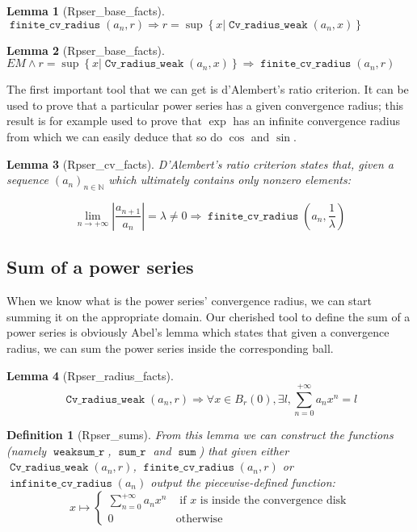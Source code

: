 \documentclass[submission,copyright]{eptcs}
\newcommand{\N}{\mathbb{N}}
\DeclareMathOperator{\cvrw}{\mathtt{Cv\_radius\_weak}}
\DeclareMathOperator{\fcvr}{\mathtt{finite\_cv\_radius}}
\DeclareMathOperator{\icvr}{\mathtt{infinite\_cv\_radius}}
\DeclareMathOperator{\Pwsr}{\mathtt{weaksum\_r}}
\DeclareMathOperator{\Psumr}{\mathtt{sum\_r}}
\DeclareMathOperator{\Psum}{\mathtt{sum}}
\newtheorem{definition}{Definition}
\newtheorem{lemma}{Lemma}
\begin{document}
\begin{lemma}[Rpser\_base\_facts] $\fcvr{}(a_n,r) \Rightarrow r = \sup
\left\lbrace x | \cvrw{}(a_n, x) \right\rbrace$ \end{lemma}

\begin{lemma}[Rpser\_base\_facts] $EM \wedge r = \sup \left\lbrace x |
\cvrw{}(a_n, x) \right\rbrace \Rightarrow \fcvr{}(a_n,r)$ \end{lemma}

The first important tool that we can get is d'Alembert's ratio criterion.
It can be used to prove that a particular power series has a given
convergence radius; this result is for example used to prove that $\exp$
has an infinite convergence radius from which we can easily deduce
that so do $\cos$ and $\sin$.

\begin{lemma}[Rpser\_cv\_facts] D'Alembert's ratio criterion states that,
given a sequence $(a_n)_{n \in \N}$ which ultimately contains only
nonzero elements:

$$\lim\limits_{n \to + \infty}\left|\frac{a_{n+1}}{a_n}\right| = \lambda \neq 0
  \Rightarrow \fcvr{}(a_n,\frac{1}{\lambda})$$
\end{lemma}

\subsection{Sum of a power series}

When we know what is the power series' convergence radius, we can start
summing it on the appropriate domain. Our cherished tool to define the sum
of a power series is obviously Abel's lemma which states that given a
convergence radius, we can sum the power series inside the corresponding
ball.

\begin{lemma}[Rpser\_radius\_facts] $$\cvrw{}(a_n,r) \Rightarrow
\forall x \in B_r(0), \exists l, \sum_{n=0}^{+\infty} a_n x^n = l$$
\end{lemma}

\begin{definition}[Rpser\_sums] From this lemma we can construct the functions
(namely $\Pwsr{}$, $\Psumr{}$ and $\Psum{}$) that given either
$\cvrw{}(a_n,r)$, $\fcvr{}(a_n,r)$ or $\icvr{}(a_n)$ output the piecewise-defined
function: $$x \mapsto \left\lbrace
\begin{array}{ll}
\sum_{n=0}^{+\infty} a_n x^n & \text{ if } x \text{ is inside the convergence
disk}\\
0 & \text{otherwise}
\end{array}\right.$$
\end{definition}
\end{document}
